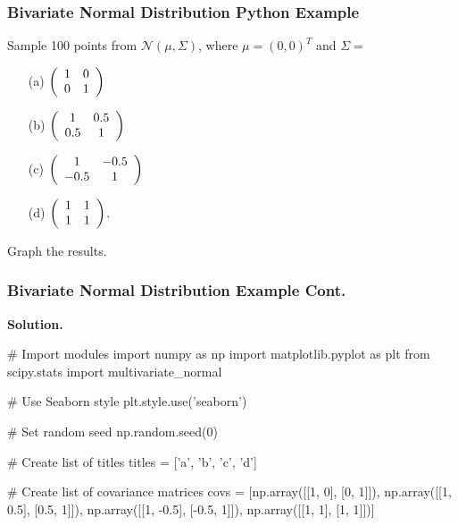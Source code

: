 \documentclass{beamer}
\begin{document}
\begin{frame}
\frametitle{Bivariate Normal Distribution Python Example}
\small
\begin{Example}
Sample 100 points from $\mathcal{N}\left(\mu, \Sigma\right)$, where $\mu = (0, 0)^T$ and $\Sigma = $
\begin{multicols}{2}
\begin{enumerate}
\item[(a)] $\left(\begin{array}{c c} 1	&	0\\ 0	&	1\end{array}\right)$
\item[(b)] $\left(\begin{array}{c c} 1	&	0.5\\ 0.5	&	1\end{array}\right)$
\item[(c)] $\left(\begin{array}{c c} 1	&	-0.5\\ -0.5	&	1\end{array}\right)$
\item[(d)] $\left(\begin{array}{c c} 1	&	1\\ 1	&	1\end{array}\right)$.
\end{enumerate}
\end{multicols}
Graph the results.
\end{Example}


\end{frame}

\begin{frame}[fragile]
\frametitle{Bivariate Normal Distribution Example Cont.}
{\bf Solution.}
{
\linespread{0.8}
\tiny
\begin{verbatim*}
# Import modules
import numpy as np
import matplotlib.pyplot as plt
from scipy.stats import multivariate_normal

# Use Seaborn style
plt.style.use('seaborn')

# Set random seed
np.random.seed(0)

# Create list of titles
titles = ['a', 'b', 'c', 'd']

# Create list of covariance matrices
covs = [np.array([[1, 0], [0, 1]]), np.array([[1, 0.5], [0.5, 1]]), 
        np.array([[1, -0.5], [-0.5, 1]]), np.array([[1, 1], [1, 1]])]

\end{verbatim*}
}

\end{frame}
\end{document}
